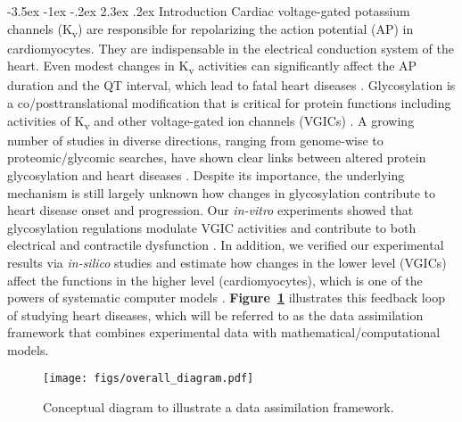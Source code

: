 \documentclass[11pt]{article}
\makeatletter
\renewcommand\section{\@startsection {section}{1}{\z@}%
                                   {-3.5ex \@plus -1ex \@minus -.2ex}%
                                   {2.3ex \@plus.2ex}%
                                   {\normalfont\fontfamily{phv}\fontsize{16}{19}\bfseries}}
\makeatother
\begin{document}
\section{Introduction}
Cardiac voltage-gated potassium channels (K\textsubscript{v}) are responsible for repolarizing the action potential (AP) in cardiomyocytes. They are indispensable in the electrical conduction system of the heart. Even modest changes in K\textsubscript{v} activities can significantly affect the AP duration and the QT interval, which lead to fatal heart diseases \citep{ravens2008role}. Glycosylation is a co/posttranslational modification that is critical for protein functions including activities of K\textsubscript{v} and other voltage-gated ion channels (VGICs) \citep{ohtsubo2006glycosylation,ednie2012modulation}. A growing number of studies in diverse directions, ranging from genome-wise to proteomic/glycomic searches, have shown clear links between altered protein glycosylation and heart diseases \citep{yung2004gene,yang2015glycoproteins,miura2016glycomics,nagai2016aberrant}. Despite its importance, the underlying mechanism is still largely unknown how changes in glycosylation contribute to heart disease onset and progression. Our \textit{in-vitro} experiments showed that glycosylation regulations modulate VGIC activities and contribute to both electrical and contractile dysfunction \citep{ednie2013sialicNav1,ednie2015sialicKv,ednie2019reduced}. In addition, we verified our experimental results via \textit{in-silico} studies and estimate how changes in the lower level (VGICs) affect the functions in the higher level (cardiomyocytes), which is one of the powers of systematic computer models \citep{du2013silico,du2015statistical,du2017silico,kim2022simulation}. \textbf{Figure~\ref{fig:framework_diagram}} illustrates this feedback loop of studying heart diseases, which will be referred to as the data assimilation framework that combines experimental data with mathematical/computational models.
\begin{figure}[!ht]
    \centering
    \texttt{[image: figs/overall\_diagram.pdf]}
    \caption{Conceptual diagram to illustrate a data assimilation framework.}
    \label{fig:framework_diagram}
\end{figure}
\end{document}
